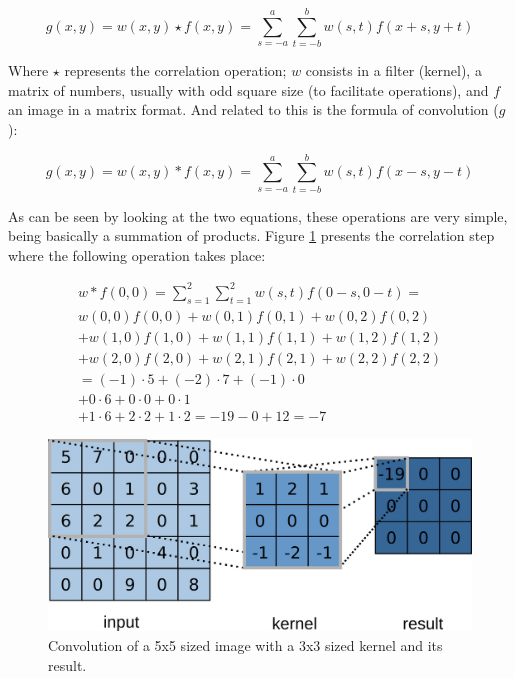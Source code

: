 \begin{equation}
\label{correlation}
g(x,y)=w(x,y)\star f(x,y)=\sum_{s=-a}^a\sum_{t=-b}^bw(s,t)f(x+s,y+t)
\end{equation}

\noindent Where $\star$ represents the correlation operation; $w$ consists in a filter (kernel), a matrix of numbers, usually with odd square size (to facilitate operations), and $f$ an image in a matrix format. And related to this is the formula of convolution ($g$):

\begin{equation}
g(x,y)=w(x,y)\ast f(x,y)=\sum_{s=-a}^a\sum_{t=-b}^bw(s,t)f(x-s,y-t)
\end{equation}

As can be seen by looking at the two equations, these operations are very simple, being basically a summation of products. Figure \ref{fig:figure117} presents the correlation step where the following operation takes place:

\begin{equation}
\begin{split}
w*f(0,0)=\sum_{s=1}^{2}\sum_{t=1}^{2}w(s,t){f}(0-s,0-t)= \\
w(0,0)f(0,0)+w(0,1)f(0,1)+w(0,2)f(0,2) \\
+w(1,0)f(1,0)+w(1,1)f(1,1)+w(1,2)f(1,2) \\
+w(2,0)f(2,0)+w(2,1)f(2,1)+w(2,2)f(2,2)\\
=(-1)\cdot5+(-2)\cdot7+(-1)\cdot0\\
+0\cdot6+0\cdot0+0\cdot1\\
+1\cdot6+2\cdot2+1\cdot2
=-19-0+12=-7
\end{split}
\end{equation}

\begin{figure}
    \centering
    \includegraphics[scale=0.40]{"Part 3 - Learning Systems/Supervised Learning/Deep Learning/images/figure117.png"}
    \caption{Convolution of a 5x5 sized image with a 3x3 sized kernel and its result.}
    \label{fig:figure117}
\end{figure}

